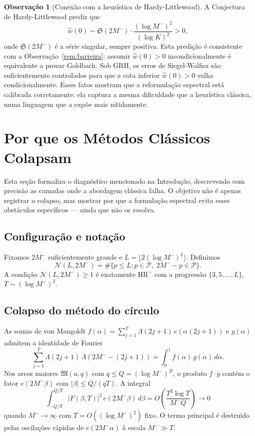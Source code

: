 \documentclass[12pt,a4paper]{article}
\theoremstyle{definition}
\newtheorem{remark}[theorem]{Observação}
\newcommand{\PP}{\mathcal{P}}          %
\newcommand{\HRm}{\mathrm{HR}^{-}}
\begin{document}
	\begin{remark}[Conexão com a heurística de Hardy-Littlewood]
		\label{rem:HL}
		A Conjectura de Hardy-Littlewood \cite{hardy-littlewood} prediz que
		\[
		\widehat{w}(0) \sim \mathfrak{S}(2M^-)\cdot\frac{(\log M^-)^2}{(\log K)^2} > 0,
		\]
		onde $\mathfrak{S}(2M^-)$ é a série singular, sempre positiva. Esta
		predição é consistente com a Observação~\ref{rem:barreira}: assumir
		$\widehat{w}(0) > 0$ incondicionalmente é equivalente a provar Goldbach.
		Sob GRH, os erros de Siegel-Walfisz são suficientemente controlados
		para que a cota inferior $\widehat{w}(0) > 0$ valha condicionalmente.
		Esses fatos mostram que a reformulação espectral está calibrada
		corretamente: ela captura a mesma dificuldade que a heurística clássica,
		numa linguagem que a expõe mais nitidamente.
	\end{remark}
	
	\section{Por que os Métodos Clássicos Colapsam}
	\label{sec:crivo}
	
	Esta seção formaliza o diagnóstico mencionado na Introdução, descrevendo
	com precisão as camadas onde a abordagem clássica falha. O objetivo não é
	apenas registrar o colapso, mas mostrar por que a formulação espectral
	evita esses obstáculos específicos — ainda que não os resolva.
	
	\subsection{Configuração e notação}
	
	Fixamos $2M^-$ suficientemente grande e $L = \lfloor 2(\log M^-)^2 \rfloor$.
	Definimos
	\[
	\mathcal{N}(L, 2M^-) = \#\{p \leq L : p \in \PP,\; 2M^- - p \in \PP\}.
	\]
	A condição $\mathcal{N}(L, 2M^-) \geq 1$ é exatamente $\HRm$ com a
	progressão $\{3, 5, \ldots, L\}$, $T \sim (\log M^-)^2$.
	
	\subsection{Colapso do método do círculo}
	
	As somas de von Mangoldt $f(\alpha) = \sum_{j=1}^T \Lambda(2j+1)\,e(\alpha(2j+1))$
	e $g(\alpha)$ admitem a identidade de Fourier
	\[
	\sum_{j=1}^T \Lambda(2j+1)\,\Lambda(2M^- - (2j+1)) = \int_0^1 f(\alpha)\,\overline{g(\alpha)}\,d\alpha.
	\]
	Nos arcos maiores $\mathfrak{M}(a,q)$ com $q \leq Q = (\log M^-)^B$, o
	produto $f\cdot\overline{g}$ contém o fator $e(2M^-\beta)$ com
	$|\beta| \leq Q/(qT)$. A integral
	\[
	\int_{-Q/T}^{Q/T}|F(\beta,T)|^2\,e(2M^-\beta)\,d\beta
	= O\!\left(\frac{T^2\log T}{M^{-}Q}\right) \to 0
	\]
	quando $M^- \to \infty$ com $T = O((\log M^-)^2)$ fixo. O termo
	principal é destruído pelas oscilações rápidas de $e(2M^-\alpha)$
	à escala $M^- \gg T$.
	
\end{document}
